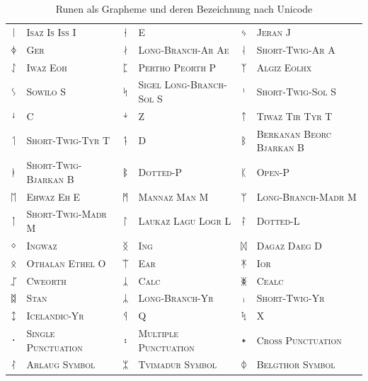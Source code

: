 \documentclass[a4paper]{scrartcl}
\begin{document}
\begin{table}[p]
\begin{center}
\begin{tabular}{clclcl}
      {\runicfont ᛁ} & \textsc{Isaz Is Iss I} &
      {\runicfont ᛂ} & \textsc{E} &
      {\runicfont ᛃ} & \textsc{Jeran J} \\
      {\runicfont ᛄ} & \textsc{Ger} &
      {\runicfont ᛅ} & \textsc{Long-Branch-Ar Ae} &
      {\runicfont ᛆ} & \textsc{Short-Twig-Ar A} \\
      {\runicfont ᛇ} & \textsc{Iwaz Eoh} &
      {\runicfont ᛈ} & \textsc{Pertho Peorth P} &
      {\runicfont ᛉ} & \textsc{Algiz Eolhx} \\
      {\runicfont ᛊ} & \textsc{Sowilo S} &
      {\runicfont ᛋ} & \textsc{Sigel Long-Branch-Sol S} &
      {\runicfont ᛌ} & \textsc{Short-Twig-Sol S} \\
      {\runicfont ᛍ} & \textsc{C} &
      {\runicfont ᛎ} & \textsc{Z} &
      {\runicfont ᛏ} & \textsc{Tiwaz Tir Tyr T} \\
      {\runicfont ᛐ} & \textsc{Short-Twig-Tyr T} &
      {\runicfont ᛑ} & \textsc{D} &
      {\runicfont ᛒ} & \textsc{Berkanan Beorc Bjarkan B} \\
      {\runicfont ᛓ} & \textsc{Short-Twig-Bjarkan B} &
      {\runicfont ᛔ} & \textsc{Dotted-P} &
      {\runicfont ᛕ} & \textsc{Open-P} \\
      {\runicfont ᛖ} & \textsc{Ehwaz Eh E} &
      {\runicfont ᛗ} & \textsc{Mannaz Man M} &
      {\runicfont ᛘ} & \textsc{Long-Branch-Madr M} \\
      {\runicfont ᛙ} & \textsc{Short-Twig-Madr M} &
      {\runicfont ᛚ} & \textsc{Laukaz Lagu Logr L} &
      {\runicfont ᛛ} & \textsc{Dotted-L} \\
      {\runicfont ᛜ} & \textsc{Ingwaz} &
      {\runicfont ᛝ} & \textsc{Ing} &
      {\runicfont ᛞ} & \textsc{Dagaz Daeg D} \\
      {\runicfont ᛟ} & \textsc{Othalan Ethel O} &
      {\runicfont ᛠ} & \textsc{Ear} &
      {\runicfont ᛡ} & \textsc{Ior} \\
      {\runicfont ᛢ} & \textsc{Cweorth} &
      {\runicfont ᛣ} & \textsc{Calc} &
      {\runicfont ᛤ} & \textsc{Cealc} \\
      {\runicfont ᛥ} & \textsc{Stan} &
      {\runicfont ᛦ} & \textsc{Long-Branch-Yr} &
      {\runicfont ᛧ} & \textsc{Short-Twig-Yr} \\
      {\runicfont ᛨ} & \textsc{Icelandic-Yr} &
      {\runicfont ᛩ} & \textsc{Q} &
      {\runicfont ᛪ} & \textsc{X} \\
      {\runicfont ᛫} & \textsc{Single Punctuation} &
      {\runicfont ᛬} & \textsc{Multiple Punctuation} &
      {\runicfont ᛭} & \textsc{Cross Punctuation} \\
      {\runicfont ᛮ} & \textsc{Arlaug Symbol} &
      {\runicfont ᛯ} & \textsc{Tvimadur Symbol} &
      {\runicfont ᛰ} & \textsc{Belgthor Symbol}
    \end{tabular}
    \caption{Runen als Grapheme und deren Bezeichnung nach Unicode}
  \end{center}
\end{table}
\end{document}

